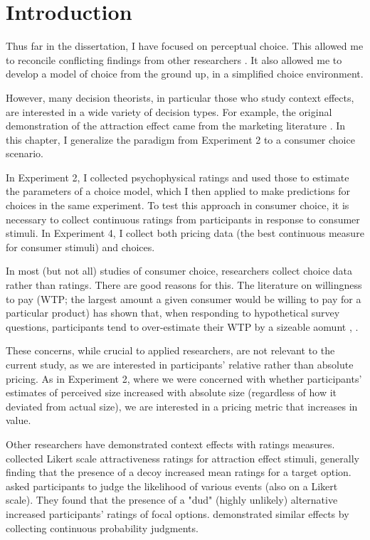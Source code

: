 \section{Introduction}
Thus far in the dissertation, I have focused on perceptual choice. This allowed me to reconcile conflicting findings from other researchers \parencite{spektorWhenGoodLooks2018b,trueblood2013not}. It also allowed me to develop a model of choice from the ground up, in a simplified choice environment.

However, many decision theorists, in particular those who study context effects, are interested in a wide variety of decision types. For example, the original demonstration of the attraction effect came from the marketing literature \parencite{huberAddingAsymmetricallyDominated1982d}. In this chapter, I generalize the paradigm from Experiment 2 to a consumer choice scenario. 

In Experiment 2, I collected psychophysical ratings and used those to estimate the parameters of a choice model, which I then applied to make predictions for choices in the same experiment. To test this approach in consumer choice, it is necessary to collect continuous ratings from participants in response to consumer stimuli. In Experiment 4, I collect both pricing data (the best continuous measure for consumer stimuli) and choices.

In most (but not all) studies of consumer choice, researchers collect choice data rather than ratings. There are good reasons for this. The literature on willingness to pay (WTP; the largest amount a given consumer would be willing to pay for a particular product) has shown that, when responding to hypothetical survey questions, participants tend to over-estimate their WTP by a sizeable aomunt \parencite{breidertREVIEWMETHODSMEASURING2006,schmidtAccuratelyMeasuringWillingness2020}, \parencite[c.f.~]{miller2011should}. 

These concerns, while crucial to applied researchers, are not relevant to the current study, as we are interested in participants' relative rather than absolute pricing. As in Experiment 2, where we were concerned with whether participants' estimates of perceived size increased with absolute size (regardless of how it deviated from actual size), we are interested in a pricing metric that increases in value. 

Other researchers have demonstrated context effects with ratings measures. \textcite{wedellUsingJudgmentsUnderstand} collected Likert scale attractiveness ratings for attraction effect stimuli, generally finding that the presence of a decoy increased mean ratings for a target option. \textcite{windschitl2004dud} asked participants to judge the likelihood of various events (also on a Likert scale). They found that the presence of a "dud" (highly unlikely) alternative increased participants' ratings of focal options. \textcite{caiWhenAlternativeHypotheses2023} demonstrated similar effects by collecting continuous probability judgments.

